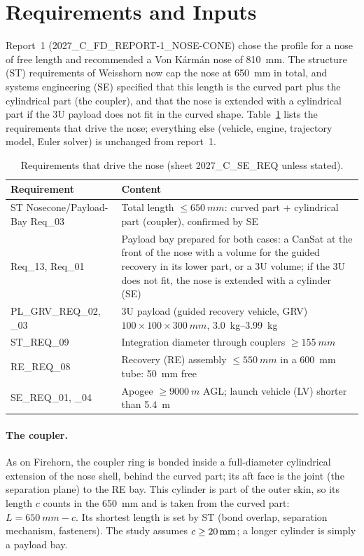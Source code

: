 \section{Requirements and Inputs}
\label{sec:inputs}

Report~1 (2027\_C\_FD\_REPORT-1\_NOSE-CONE) chose the profile for a nose of free length and
recommended a Von K\'arm\'an nose of \SI{810}{mm}. The structure (ST) requirements of Weisshorn now
cap the nose at \SI{650}{mm} in total, and systems engineering (SE) specified that this length is the
curved part plus the cylindrical part (the coupler), and that the nose is extended with a
cylindrical part if the 3U payload does not fit in the curved shape. Table~\ref{tab:req} lists the
requirements that drive the nose; everything else (vehicle, engine, trajectory model, Euler solver)
is unchanged from report~1.

\begin{table}[H]
\centering
\caption{Requirements that drive the nose (sheet 2027\_C\_SE\_REQ unless stated).}
\label{tab:req}
\small
\begin{tabular}{@{}>{\raggedright\arraybackslash}p{4.3cm}>{\raggedright\arraybackslash}p{11.2cm}@{}}
\toprule
Requirement & Content \\
\midrule
ST Nosecone/Payload-Bay Req\_03 & Total length $\leq\SI{650}{mm}$: curved part + cylindrical part (coupler), confirmed by SE \\
Req\_13, Req\_01 & Payload bay prepared for both cases: a CanSat at the front of the nose with a volume for the guided recovery in its lower part, or a 3U volume; if the 3U does not fit, the nose is extended with a cylinder (SE) \\
PL\_GRV\_REQ\_02, \_03 & 3U payload (guided recovery vehicle, GRV) $100\times100\times\SI{300}{mm}$, \SIrange{3.0}{3.99}{kg} \\
ST\_REQ\_09 & Integration diameter through couplers $\geq\SI{155}{mm}$ \\
RE\_REQ\_08 & Recovery (RE) assembly $\leq\SI{550}{mm}$ in a \SI{600}{mm} tube: \SI{50}{mm} free \\
SE\_REQ\_01, \_04 & Apogee $\geq\SI{9000}{m}$ AGL; launch vehicle (LV) shorter than \SI{5.4}{m} \\
\bottomrule
\end{tabular}
\end{table}

\paragraph{The coupler.} As on Firehorn, the coupler ring is bonded inside a full-diameter
cylindrical extension of the nose shell, behind the curved part; its aft face is the joint (the
separation plane) to the RE bay. This cylinder is part of the outer skin, so its length $c$ counts in
the \SI{650}{mm} and is taken from the curved part: $L = \SI{650}{mm} - c$. Its shortest length is
set by ST (bond overlap, separation mechanism, fasteners). The study assumes $c\geq\SI{20}{mm}$; a longer
cylinder is simply a payload bay.

